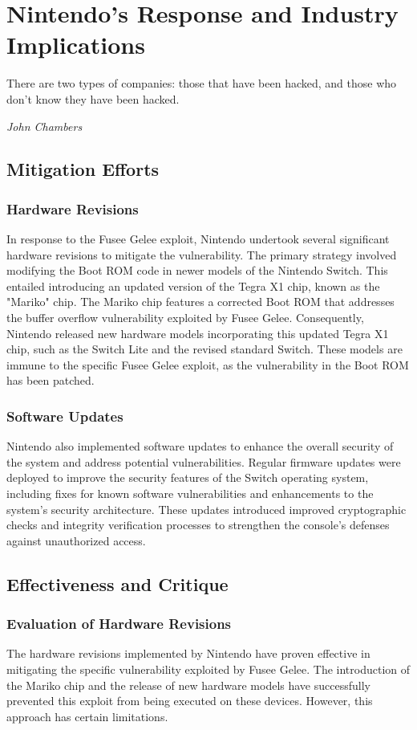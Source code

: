 \chapter{Nintendo's Response and Industry Implications}
\epigraph{There are two types of companies: those that have been hacked, and those who don't know they have been hacked.}{\textit{John Chambers}}

\section{Mitigation Efforts}

\subsection{Hardware Revisions}
In response to the Fusee Gelee exploit, Nintendo undertook several significant hardware revisions to mitigate the vulnerability. The primary strategy involved modifying the Boot ROM code in newer models of the Nintendo Switch. This entailed introducing an updated version of the Tegra X1 chip, known as the "Mariko" chip.\cite{SwitchSystemFlaws} The Mariko chip features a corrected Boot ROM that addresses the buffer overflow vulnerability exploited by Fusee Gelee. Consequently, Nintendo released new hardware models incorporating this updated Tegra X1 chip, such as the Switch Lite and the revised standard Switch. These models are immune to the specific Fusee Gelee exploit, as the vulnerability in the Boot ROM has been patched.
\subsection{Software Updates}
Nintendo also implemented software updates to enhance the overall security of the system and address potential vulnerabilities. Regular firmware updates were deployed to improve the security features of the Switch operating system, including fixes for known software vulnerabilities and enhancements to the system's security architecture. These updates introduced improved cryptographic checks and integrity verification processes to strengthen the console's defenses against unauthorized access.


\section{Effectiveness and Critique}

\subsection{Evaluation of Hardware Revisions}
The hardware revisions implemented by Nintendo have proven effective in mitigating the specific vulnerability exploited by Fusee Gelee. The introduction of the Mariko chip and the release of new hardware models have successfully prevented this exploit from being executed on these devices. However, this approach has certain limitations.

